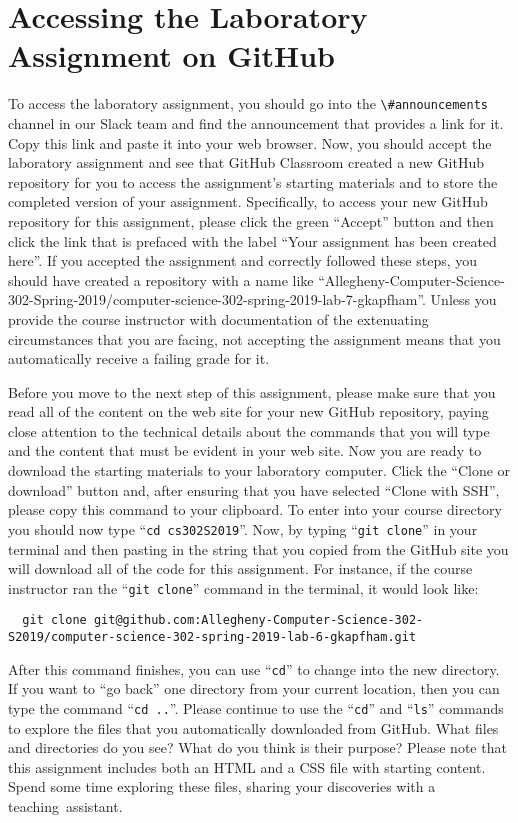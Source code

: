 \documentclass[11pt]{article}
\newcommand{\command}[1]{``\lstinline{#1}''}
\newcommand{\channel}[1]{\lstinline{#1}}
\newcommand{\step}[1]{``{#1}''}
\begin{document}
\section*{Accessing the Laboratory Assignment on GitHub}

To access the laboratory assignment, you should go into the
\channel{\#announcements} channel in our Slack team and find the announcement
that provides a link for it. Copy this link and paste it into your web browser.
Now, you should accept the laboratory assignment and see that GitHub Classroom
created a new GitHub repository for you to access the assignment's starting
materials and to store the completed version of your assignment. Specifically,
to access your new GitHub repository for this assignment, please click the green
``Accept'' button and then click the link that is prefaced with the label ``Your
assignment has been created here''. If you accepted the assignment and correctly
followed these steps, you should have created a repository with a name like
``Allegheny-Computer-Science-302-Spring-2019/computer-science-302-spring-2019-lab-7-gkapfham''.
Unless you provide the course instructor with documentation of the extenuating
circumstances that you are facing, not accepting the assignment means that you
automatically receive a failing grade for it.

Before you move to the next step of this assignment, please make sure that you
read all of the content on the web site for your new GitHub repository, paying
close attention to the technical details about the commands that you will type
and the content that must be evident in your web site. Now you are ready to
download the starting materials to your laboratory computer. Click the ``Clone
or download'' button and, after ensuring that you have selected ``Clone with
SSH'', please copy this command to your clipboard. To enter into your course
directory you should now type \command{cd cs302S2019}. Now, by typing
\command{git clone} in your terminal and then pasting in the string that you
copied from the GitHub site you will download all of the code for this
assignment. For instance, if the course instructor ran the \command{git clone}
command in the terminal, it would look like:

\begin{lstlisting}
  git clone git@github.com:Allegheny-Computer-Science-302-S2019/computer-science-302-spring-2019-lab-6-gkapfham.git
\end{lstlisting}

After this command finishes, you can use \command{cd} to change into the new
directory. If you want to \step{go back} one directory from your current
location, then you can type the command \command{cd ..}. Please continue to use
the \command{cd} and \command{ls} commands to explore the files that you
automatically downloaded from GitHub. What files and directories do you see?
What do you think is their purpose? Please note that this assignment includes
both an HTML and a CSS file with starting content. Spend some time exploring
these files, sharing your discoveries with a \mbox{teaching assistant}.
\end{document}
